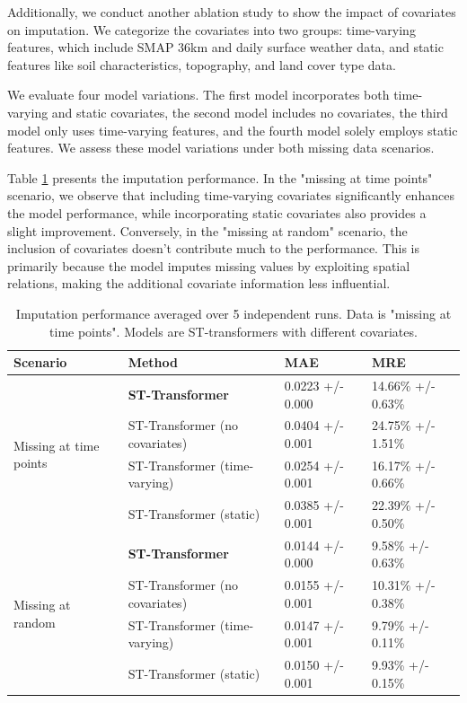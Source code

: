 \documentclass[11pt]{article}
\begin{document}
Additionally, we conduct another ablation study to show the impact of covariates on imputation. We categorize the covariates into two groups: time-varying features, which include SMAP 36km and daily surface weather data, and static features like soil characteristics, topography, and land cover type data.

We evaluate four model variations. The first model incorporates both time-varying and static covariates, the second model includes no covariates, the third model only uses time-varying features, and the fourth model solely employs static features. We assess these model variations under both missing data scenarios.

Table \ref{tab: ablation_study_2} presents the imputation performance. In the "missing at time points" scenario, we observe that including time-varying covariates significantly enhances the model performance, while incorporating static covariates also provides a slight improvement. Conversely, in the "missing at random" scenario, the inclusion of covariates doesn't contribute much to the performance. This is primarily because the model imputes missing values by exploiting spatial relations, making the additional covariate information less influential.


\begin{table}[h!]
    \centering
    \begin{tabularx}{\textwidth}{XXXX}
        \toprule
        Scenario&Method & MAE & MRE \\
        \midrule
        \multirow{4}{*}{Missing at time points}&\textbf{ST-Transformer} &  0.0223 +/- 0.000 & 14.66\% +/- 0.63\%  \\

        &ST-Transformer (no covariates) & 0.0404 +/- 0.001& 24.75\% +/- 1.51\%\\
        &ST-Transformer (time-varying) & 0.0254	 +/- 0.001& 16.17\% +/- 0.66\% \\
        &ST-Transformer (static) & 0.0385 +/- 0.001 & 22.39\% +/- 0.50\% \\
        \midrule
          \multirow{4}{*}{Missing at random}&\textbf{ST-Transformer} & 0.0144 +/- 0.000 & 9.58\% +/- 0.63\%  \\
        &ST-Transformer (no covariates) & 0.0155 +/- 0.001& 10.31\% +/- 0.38\%\\
        &ST-Transformer (time-varying) & 0.0147 +/- 0.001& 9.79\% +/- 0.11\% \\
        &ST-Transformer (static) & 0.0150 +/- 0.001 & 9.93\% +/- 0.15\% \\
        \bottomrule

        
    \end{tabularx}
    \caption{Imputation performance averaged over 5 independent runs. Data is "missing at time points". Models are ST-transformers with different covariates.}
    \label{tab: ablation_study_2}
\end{table}
\end{document}
